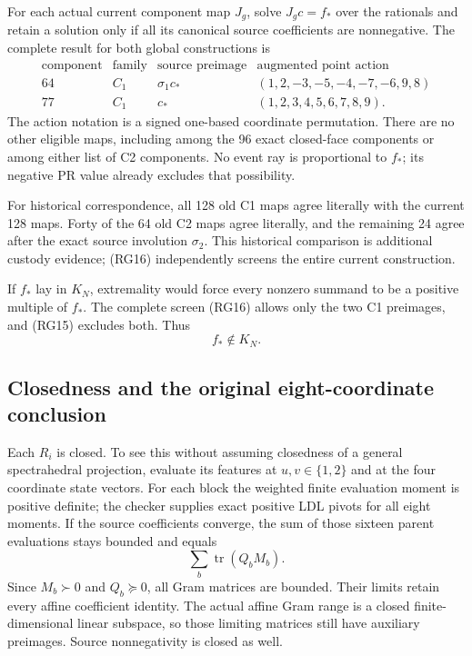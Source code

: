For each actual current component map $J_g$, solve
$J_gc=f_*$ over the rationals and retain a solution only if all its
canonical source coefficients are nonnegative.  The complete result
for both global constructions is
\[
\begin{array}{c|c|c|c}
 \text{component}&\text{family}&\text{source preimage}&
 \text{augmented point action}\\ \hline
 64&C_1&\sigma_1c_*&(1,2,-3,-5,-4,-7,-6,9,8)\\
 77&C_1&c_*&(1,2,3,4,5,6,7,8,9).
\end{array}                                                       \tag{RG16}
\]
The action notation is a signed one-based coordinate permutation.
There are no other eligible maps, including among the 96 exact
closed-face components or among either list of C2 components.  No
event ray is proportional to $f_*$; its negative PR value already
excludes that possibility.

For historical correspondence, all 128 old C1 maps agree literally
with the current 128 maps.  Forty of the 64 old C2 maps agree
literally, and the remaining 24 agree after the exact source
involution $\sigma_2$.  This historical comparison is additional
custody evidence; (RG16) independently screens the entire current
construction.

If $f_*$ lay in $K_N$, extremality would force every nonzero summand
to be a positive multiple of $f_*$.  The complete screen (RG16)
allows only the two C1 preimages, and (RG15) excludes both.
Thus
\[
                         f_*\notin K_N.                          \tag{RG17}
\]

\subsection{Closedness and the original eight-coordinate conclusion}

Each $R_i$ is closed.  To see this without assuming closedness of a
general spectrahedral projection, evaluate its features at
$u,v\in\{1,2\}$ and at the four coordinate state vectors.  For
each block the weighted finite evaluation moment is positive definite;
the checker supplies exact positive LDL pivots for all eight moments.
If the source coefficients converge, the sum of those sixteen parent
evaluations stays bounded and equals
\[
                    \sum_b\operatorname{tr}(Q_bM_b).              \tag{RG18}
\]
Since $M_b\succ0$ and $Q_b\succeq0$, all Gram matrices are bounded.
Their limits retain every affine coefficient identity.  The actual
affine Gram range is a closed finite-dimensional linear subspace,
so those limiting matrices still have auxiliary preimages.  Source
nonnegativity is closed as well.

